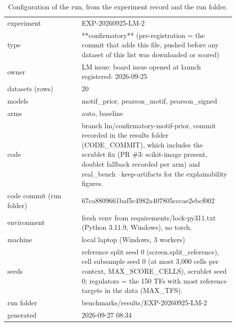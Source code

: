 \begin{table}[H]\centering\small
\caption{Configuration of the run, from the experiment record and the run folder.}
\begin{tabular}{p{0.3\linewidth}p{0.62\linewidth}}\toprule
experiment & EXP-20260925-LM-2 \\
type & **confirmatory** (pre-registration = the commit that adds this file, pushed before any dataset of this list was downloaded or scored) \\
owner & LM   issue: board issue opened at launch   registered: 2026-09-25 \\
datasets (rows) & 20 \\
models & motif\_prior, pearson\_motif, pearson\_signed \\
arms & auto, baseline \\
code & branch lm/confirmatory-motif-prior, commit recorded in the results folder (CODE\_COMMIT), which includes the scrublet fix (PR \#3: scikit-image present, doublet fallback recorded per arm) and real\_bench --keep-artifacts for the explainability figures. \\
code commit (run folder) & 67ca8809661baf5c4982a407805cccae2ebcf002 \\
environment & fresh venv from requirements/lock-py311.txt (Python 3.11.9, Windows), no torch. \\
machine & local laptop (Windows, 3 workers) \\
seeds & reference split seed 0 (screen.split\_reference), cell subsample seed 0 (at most 3,000 cells per context, MAX\_SCORE\_CELLS), scrublet seed 0; regulators = the 150 TFs with most reference targets in the data (MAX\_TFS). \\
run folder & benchmarks/results/EXP-20260925-LM-2 \\
generated & 2026-09-27 08:34 \\
\bottomrule\end{tabular}\end{table}
